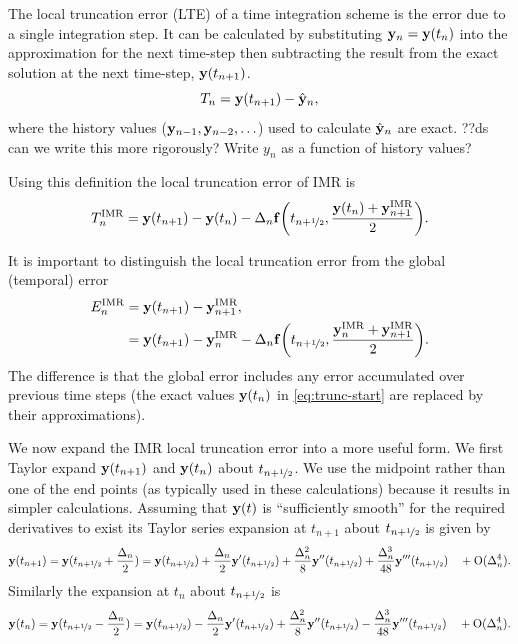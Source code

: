 The local truncation error (LTE) of a time integration scheme is the error due to a single integration step.
It can be calculated by substituting $\mathbf{y}_n = \mathbf{y}(t_n)$ into the approximation for the next time-step then subtracting the result from the exact solution at the next time-step, $\mathbf{y}(t_{n+1})$. 
\ie
\begin{equation}
  T_n = \mathbf{y}(t_{n+1}) - \hat{\mathbf{y}}_n,
\end{equation}
where the history values ($\mathbf{y}_{n-1}, \mathbf{y}_{n-2}, \ldots$) used to calculate $\hat{\mathbf{y}}_n$ are exact.
??ds can we write this more rigorously? Write $y_n$ as a function of history values?

Using this definition the local truncation error of IMR is
\begin{equation}
  \lte^\imr =  \yv(t_{n+1}) - \yv(t_n) - \dtn \ffv{\thf, \frac{\yv(t_n) + \yv_{n+1}^\imr}{2}}.
  \label{eq:trunc-start}
\end{equation}

It is important to distinguish the local truncation error from the global (temporal) error
\begin{equation}
  \label{eq:global-temporal-error}
  \begin{aligned}
    E_n^\imr &= \yv(t_{n+1}) - \yv_{n+1}^\imr, \\
    &=  \yv(t_{n+1}) - \yv_n^\imr - \dtn \ffv{ \thf, \frac{\yv_n^\imr + \yv_{n+1}^\imr}{2} }.
  \end{aligned}
\end{equation}
The difference is that the global error includes any error accumulated over previous time steps (the exact values $\mathbf{y}(t_n)$ in \eqref{eq:trunc-start} are replaced by their approximations).

We now expand the IMR local truncation error into a more useful form.
We first Taylor expand $\mathbf{y}(t_{n+1})$ and $\mathbf{y}(t_{n})$ about $t_{n+\nicefrac{1}{2}}$.
We use the midpoint rather than one of the end points (as typically used in these calculations) because it results in simpler calculations.
Assuming that $\mathbf{y}(t)$ is ``sufficiently smooth'' for the required derivatives to exist its Taylor series expansion at $t_{n+1}$ about $t_{n+\nicefrac{1}{2}}$ is given by
\begin{equation}
  \yv(t_{n+1}) = \yv(\thf + \frac{\dtn}{2}) = \yvhf + \frac{\dtn}{2} \yvhf['] 
  + \frac{\dtn^2}{8} \yvhf['']
  + \frac{\dtn^3}{48} \yvhf[''']
  \porder{\dtn^4}.
  \label{eq:taylornp1}
\end{equation}
Similarly the expansion at $t_n$ about $t_{n+\nicefrac{1}{2}}$ is
\begin{equation}
  \yv(t_n) = \yv(\thf - \frac{\dtn}{2}) = \yvhf - \frac{\dtn}{2} \yvhf['] 
  + \frac{\dtn^2}{8} \yvhf[''] 
  - \frac{\dtn^3}{48} \yvhf['''] 
  \porder{\dtn^4}.
  \label{eq:taylorn}
\end{equation}

